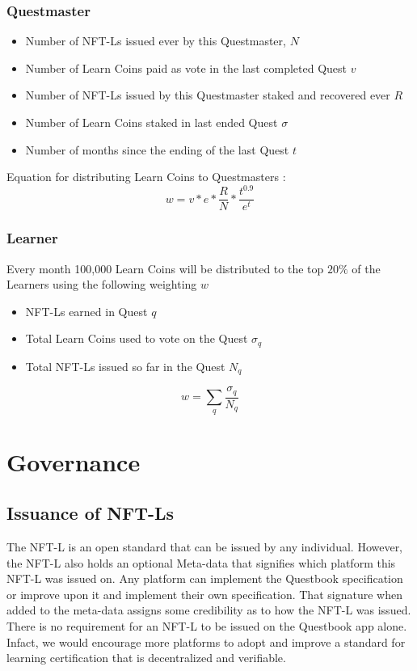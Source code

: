 \documentclass{article}
\begin{document}
      \subsubsection{Questmaster}
        \begin{itemize}
          \item Number of NFT-Ls issued ever by this Questmaster, \(N\)
          \item Number of Learn Coins paid as vote in the last completed Quest \(v\)
          \item Number of NFT-Ls issued by this Questmaster staked and recovered ever \(R\)
          \item Number of Learn Coins staked in last ended Quest \(\sigma\)
          \item Number of months since the ending of the last Quest \(t\)
        \end{itemize}
        Equation for distributing Learn Coins to Questmasters :
        \[
          w =  v * e * \frac{R}{N} * \frac{t^{0.9}}{e^{t}}
        \]

      \subsubsection{Learner }  
        Every month 100,000 Learn Coins will be distributed to the top \(20\%\) of the Learners using the following weighting \(w\) 
        \begin{itemize}
          \item NFT-Ls earned in Quest \(q\)
          \item Total Learn Coins used to vote on the Quest \(\sigma_q\)
          \item Total NFT-Ls issued so far in the Quest \(N_q\)
        \end{itemize}
        \[
          w = \sum_{q} \frac{\sigma_q}{N_q}
        \]
  \section{Governance}
    \subsection{Issuance of NFT-Ls}
      The NFT-L is an open standard that can be issued by any individual. However, the NFT-L also holds an optional Meta-data that signifies which platform this NFT-L was issued on.
      Any platform can implement the Questbook specification or improve upon it and implement their own specification. That signature when added to the meta-data assigns some credibility as to how the NFT-L was issued.
      \break
      There is no requirement for an NFT-L to be issued on the Questbook app alone. Infact, we would encourage more platforms to adopt and improve a standard for learning certification that is decentralized and verifiable.
\end{document}
